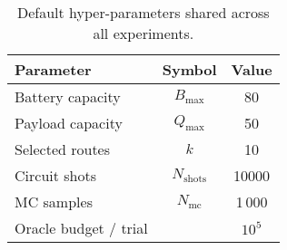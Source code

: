 \begin{table}[H]
\centering
\begin{tabular}{lcc}
\toprule
Parameter & Symbol & Value \\
\midrule
Battery capacity & $B_{\max}$ & 80 \\
Payload capacity & $Q_{\max}$ & 50 \\
Selected routes & $k$ & 10 \\
Circuit shots & $N_{\text{shots}}$ & 10000 \\
MC samples & $N_{\text{mc}}$ & 1\,000 \\
Oracle budget / trial &  & $10^{5}$ \\
\bottomrule
\end{tabular}
\caption{Default hyper-parameters shared across all experiments.}
\label{tab:hyperparams}
\end{table}